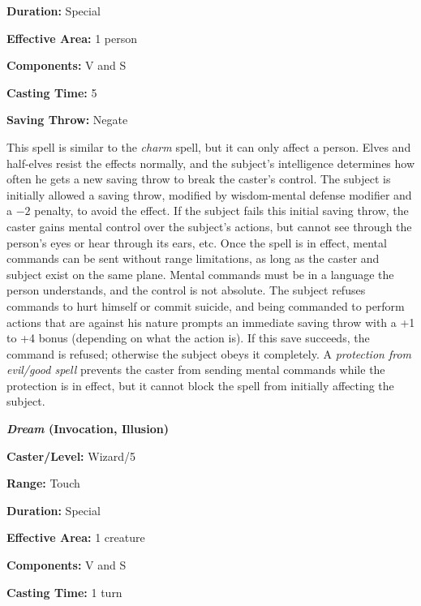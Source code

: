 \begin{multicols}{2}
\begin{minipage}{\columnwidth}
\noindent \textbf{Duration:} Special

\noindent \textbf{Effective Area:} 1 person

\noindent \textbf{Components:} V and S

\noindent \textbf{Casting Time:} 5

\noindent \textbf{Saving Throw:} Negate

\end{minipage}

This spell is similar to the \textit{charm} spell, but it can only affect a person.  Elves and half-elves resist the effects normally, and the subject's intelligence determines how often he gets a new saving throw to break the caster's control.  The subject is initially allowed a saving throw, modified by wisdom-mental defense modifier and a $-2$ penalty, to avoid the effect.  If the subject fails this initial saving throw, the caster gains mental control over the subject's actions, but cannot see through the person's eyes or hear through its ears, etc.  Once the spell is in effect, mental commands can be sent without range limitations, as long as the caster and subject exist on the same plane.  Mental commands must be in a language the person understands, and the control is not absolute.  The subject refuses commands to hurt himself or commit suicide, and being commanded to perform actions that are against his nature prompts an immediate saving throw with a +1 to +4 bonus (depending on what the action is).  If this save succeeds, the command is refused; otherwise the subject obeys it completely.  A \textit{protection from evil/good spell} prevents the caster from sending mental commands while the protection is in effect, but it cannot block the spell from initially affecting the subject. 

\vspace{1em}

\noindent
\begin{minipage}{\columnwidth}

\noindent \textbf{\textit{Dream} (Invocation, Illusion)}

\noindent \textbf{Caster/Level:} Wizard/5

\noindent \textbf{Range:} Touch

\noindent \textbf{Duration:} Special

\noindent \textbf{Effective Area:} 1 creature

\noindent \textbf{Components:} V and S

\noindent \textbf{Casting Time:} 1 turn


\end{minipage}
\end{multicols}
